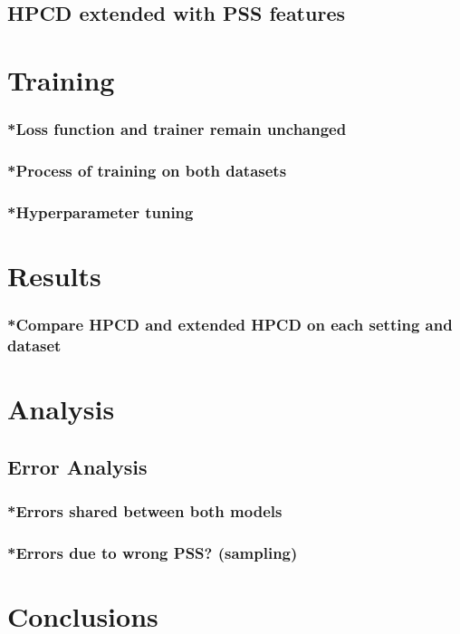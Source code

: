\subsection{HPCD extended with PSS features}

\section{Training}
\subsubsection{*Loss function and trainer remain unchanged}
\subsubsection{*Process of training on both datasets}
\subsubsection{*Hyperparameter tuning}

\section{Results}
\subsubsection{*Compare HPCD and extended HPCD on each setting and dataset}

\section{Analysis}
\subsection{Error Analysis}
\subsubsection{*Errors shared between both models}
\subsubsection{*Errors due to wrong PSS? (sampling)}

\section{Conclusions}
